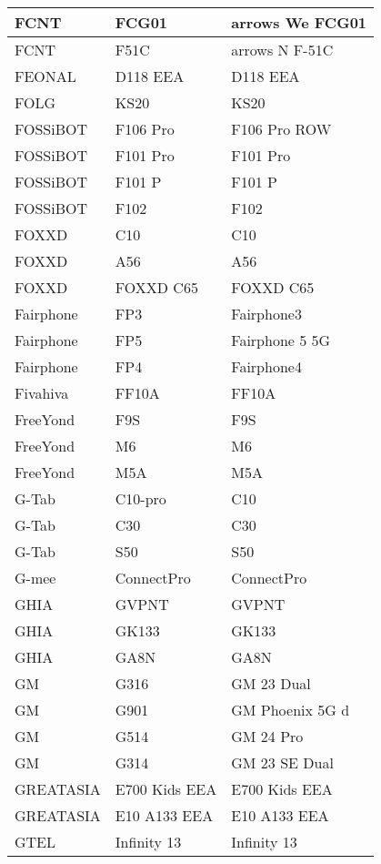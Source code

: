 \begin{tabularx}{\linewidth}{|l|X|X|}
        FCNT & FCG01 & arrows We FCG01 \\ \hline
        FCNT & F51C & arrows N F-51C \\ \hline
        FEONAL & D118 EEA & D118 EEA \\ \hline
        FOLG & KS20 & KS20 \\ \hline
        FOSSiBOT & F106 Pro & F106 Pro ROW \\ \hline
        FOSSiBOT & F101 Pro & F101 Pro \\ \hline
        FOSSiBOT & F101 P & F101 P \\ \hline
        FOSSiBOT & F102 & F102 \\ \hline
        FOXXD & C10 & C10 \\ \hline
        FOXXD & A56 & A56 \\ \hline
        FOXXD & FOXXD C65 & FOXXD C65 \\ \hline
        Fairphone & FP3 & Fairphone3 \\ \hline
        Fairphone & FP5 & Fairphone 5 5G \\ \hline
        Fairphone & FP4 & Fairphone4 \\ \hline
        Fivahiva & FF10A & FF10A \\ \hline
        FreeYond & F9S & F9S \\ \hline
        FreeYond & M6 & M6 \\ \hline
        FreeYond & M5A & M5A \\ \hline
        G-Tab & C10-pro & C10 \\ \hline
        G-Tab & C30 & C30 \\ \hline
        G-Tab & S50 & S50 \\ \hline
        G-mee & ConnectPro & ConnectPro \\ \hline
        GHIA & GVPNT & GVPNT \\ \hline
        GHIA & GK133 & GK133 \\ \hline
        GHIA & GA8N & GA8N \\ \hline
        GM & G316 & GM 23 Dual \\ \hline
        GM & G901 & GM Phoenix 5G d \\ \hline
        GM & G514 & GM 24 Pro \\ \hline
        GM & G314 & GM 23 SE Dual \\ \hline
        GREATASIA & E700 Kids EEA & E700 Kids EEA \\ \hline
        GREATASIA & E10 A133 EEA & E10 A133 EEA \\ \hline
        GTEL & Infinity 13 & Infinity 13 \\ \hline

\end{tabularx}

